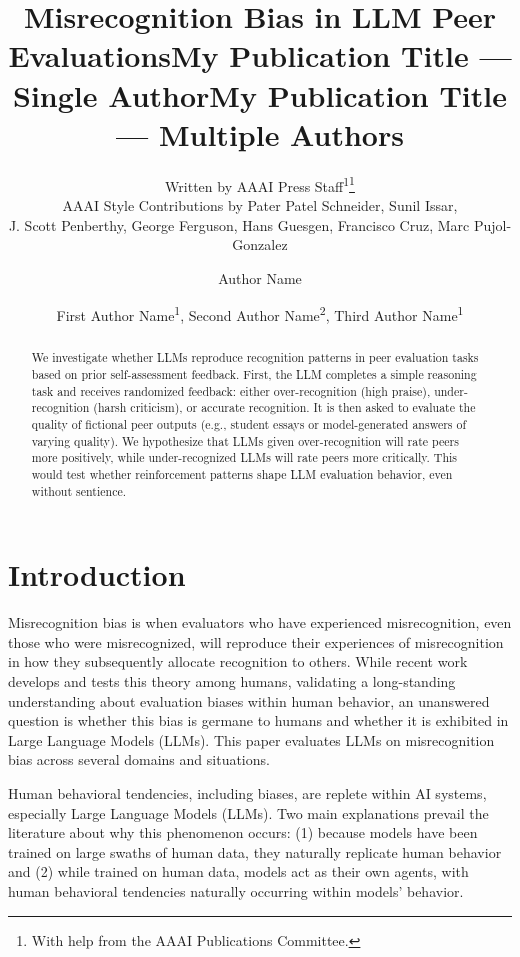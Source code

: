 \documentclass[letterpaper]{article} %
\title{Misrecognition Bias in LLM Peer Evaluations}
\author{
    Written by AAAI Press Staff\textsuperscript{\rm 1}\thanks{With help from the AAAI Publications Committee.}\\
    AAAI Style Contributions by Pater Patel Schneider,
    Sunil Issar,\\
    J. Scott Penberthy,
    George Ferguson,
    Hans Guesgen,
    Francisco Cruz\equalcontrib,
    Marc Pujol-Gonzalez\equalcontrib
}
\title{My Publication Title --- Single Author}
\author {
    Author Name
}
\title{My Publication Title --- Multiple Authors}
\author {
    First Author Name\textsuperscript{\rm 1},
    Second Author Name\textsuperscript{\rm 2},
    Third Author Name\textsuperscript{\rm 1}
}
\begin{document}
\maketitle

\begin{abstract}
We investigate whether LLMs reproduce recognition patterns in peer evaluation tasks based on prior self-assessment feedback. First, the LLM completes a simple reasoning task and receives randomized feedback: either over-recognition (high praise), under-recognition (harsh criticism), or accurate recognition. It is then asked to evaluate the quality of fictional peer outputs (e.g., student essays or model-generated answers of varying quality). We hypothesize that LLMs given over-recognition will rate peers more positively, while under-recognized LLMs will rate peers more critically. This would test whether reinforcement patterns shape LLM evaluation behavior, even without sentience.
\end{abstract}


\section{Introduction}

Misrecognition bias is when evaluators who have experienced misrecognition, even those who were misrecognized, will reproduce their experiences of misrecognition in how they subsequently allocate recognition to others. While recent work \cite{Abraham2025Not} develops and tests this theory among humans, validating a long-standing understanding about evaluation biases within human behavior, an unanswered question is whether this bias is germane to humans and whether it is exhibited in Large Language Models (LLMs). This paper evaluates LLMs on misrecognition bias across several domains and situations.

Human behavioral tendencies, including biases, are replete within AI systems, especially Large Language Models (LLMs). Two main explanations prevail the literature about why this phenomenon occurs: (1) because models have been trained on large swaths of human data, they naturally replicate human behavior and (2) while trained on human data, models act as their own agents, with human behavioral tendencies naturally occurring within models' behavior.
\end{document}
